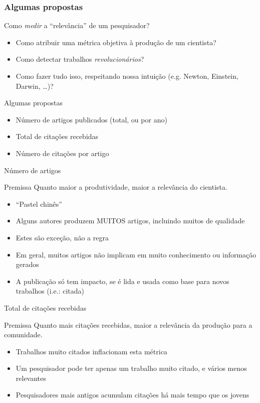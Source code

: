 \documentclass{beamer}
\begin{document}
\subsubsection{Algumas propostas}

\begin{frame}{Como {\em medir} a ``relevância'' de um pesquisador?}
  \begin{itemize}
  \item Como atribuir uma métrica objetiva à produção de um cientista?
  \item Como detectar trabalhos {\em revolucionários}?
  \item Como fazer tudo isso, respeitando nossa intuição (e.g. Newton, Einstein, Darwin, \ldots)?
  \end{itemize}
\end{frame}

\begin{frame}{Algumas propostas}
  \begin{itemize}
  \item Número de artigos publicados (total, ou por ano)
  \item Total de citações recebidas
  \item Número de citações por artigo
  \end{itemize}
\end{frame}

\begin{frame}{Número de artigos}
  \begin{block}{Premissa}
    Quanto maior a produtividade, maior a relevância do cientista.
  \end{block}
  \begin{itemize}
  \item ``Pastel chinês''
  \item Alguns autores produzem MUITOS artigos, incluindo muitos de qualidade
  \item Estes são exceção, não a regra
  \item Em geral, muitos artigos não implicam em muito conhecimento ou informação gerados
  \item A publicação só tem impacto, se é lida e usada como base para novos trabalhos (i.e.: \alert{citada})
  \end{itemize}
\end{frame}

\begin{frame}{Total de citações recebidas}
  \begin{block}{Premissa}
    Quanto mais citações recebidas, maior a relevância da produção para a comunidade.
  \end{block}
  \begin{itemize}
  \item Trabalhos muito citados inflacionam esta métrica
  \item Um pesquisador pode ter apenas um trabalho muito citado, e vários menos relevantes
  \item Pesquisadores mais antigos acumulam citações há mais tempo que os jovens
  \end{itemize}
\end{frame}
\end{document}
